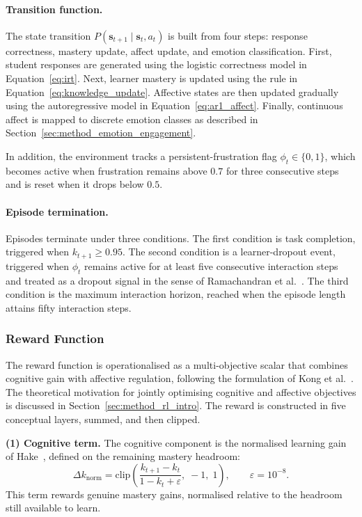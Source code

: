 \paragraph{Transition function.}
The state transition $P(\mathbf{s}_{t+1} \mid \mathbf{s}_t, a_t)$ is built from four steps: response correctness, mastery update, affect update, and emotion classification. First, student responses are generated using the logistic correctness model in Equation~\eqref{eq:irt}. Next, learner mastery is updated using the rule in Equation~\eqref{eq:knowledge_update}. Affective states are then updated gradually using the autoregressive model in Equation~\eqref{eq:ar1_affect}. Finally, continuous affect is mapped to discrete emotion classes as described in Section~\ref{sec:method_emotion_engagement}.

In addition, the environment tracks a persistent-frustration flag $\phi_t \in \{0,1\}$, which becomes active when frustration remains above $0.7$ for three consecutive steps and is reset when it drops below $0.5$.

\paragraph{Episode termination.} Episodes terminate under three conditions. The first condition is task completion, triggered when $k_{t+1} \geq 0.95$. The second condition is a learner-dropout event, triggered when $\phi_t$ remains active for at least five consecutive interaction steps and treated as a dropout signal in the sense of Ramachandran et al.~\cite{ramachandran_pomdp_2018}. The third condition is the maximum interaction horizon, reached when the episode length attains fifty interaction steps.

\subsubsection{Reward Function}\label{sec:method_reward}

The reward function is operationalised as a multi-objective scalar that combines cognitive gain with affective regulation, following the formulation of Kong et al.~\cite{kong_real-time_2025}. The theoretical motivation for jointly optimising cognitive and affective objectives is discussed in Section~\ref{sec:method_rl_intro}. The reward is constructed in five conceptual layers, summed, and then clipped.

\textbf{(1) Cognitive term.} The cognitive component is the normalised learning gain of Hake~\cite{hake_normalized_gain_1998}, defined on the remaining mastery headroom:
\begin{equation}
    \Delta k_\mathrm{norm} = \mathrm{clip}\!\left(
        \frac{k_{t+1} - k_t}{1 - k_t + \varepsilon},\; -1,\; 1
    \right), \qquad \varepsilon = 10^{-8}.
    \label{eq:delta_k_norm}
\end{equation}
This term rewards genuine mastery gains, normalised relative to the headroom still available to learn.


